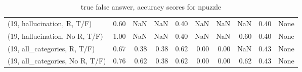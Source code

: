 \begin{table*}[h!]
\begin{adjustbox}{width=2\columnwidth,center}
\begin{tabular}{lrrr|rrr|rrr}
(19, hallucination, R, T/F)           &                      0.60 &                   NaN &                       NaN &                          0.40 &                       NaN &                           NaN &                                    NaN &                               0.40 &                                  None \\
(19, hallucination, No R, T/F)        &                      1.00 &                   NaN &                       NaN &                          0.40 &                       NaN &                           NaN &                                   0.60 &                               0.40 &                                  None \\
(19, all\_categories, R, T/F)          &                      0.67 &                  0.38 &                      0.38 &                          0.62 &                      0.00 &                          0.00 &                                    NaN &                               0.43 &                                  None \\
(19, all\_categories, No R, T/F)       &                      0.76 &                  0.62 &                      0.38 &                          0.62 &                      0.00 &                          0.00 &                                   0.62 &                               0.43 &                                  None \\


\bottomrule
\end{tabular}
\end{adjustbox}
\caption{true false answer, accuracy scores for npuzzle}
\end{table*}